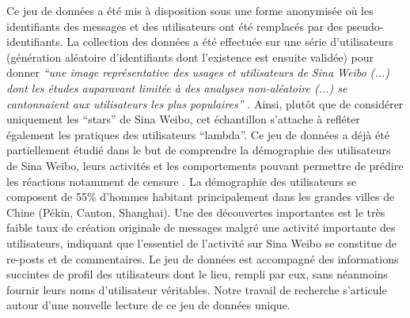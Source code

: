 Ce jeu de donn\'ees a \'et\'e mis \`a disposition sous une forme
anonymis\'ee o\`u les identifiants des messages et des utilisateurs ont
\'et\'e remplac\'es par des pseudo-identifiants. La collection des
donn\'ees a \'et\'e effectu\'ee sur une s\'erie
d{\textquoteright}utilisateurs (g\'en\'eration al\'eatoire
d{\textquoteright}identifiants dont l{\textquoteright}existence est
ensuite valid\'ee) pour donner \textit{{\textquotedblleft}une image
repr\'esentative des usages et utilisateurs de Sina Weibo (...) dont
les \'etudes auparavant limit\'ee \`a des analyses non-al\'eatoire
(...) se cantonnaient aux utilisateurs les plus
populaires{\textquotedblright} }\citep{Fu2013}. Ainsi, plut\^ot que
de consid\'erer uniquement les
{\textquotedblleft}stars{\textquotedblright} de Sina Weibo, cet
\'echantillon s{\textquoteright}attache \`a refl\'eter \'egalement les
pratiques des utilisateurs
{\textquotedblleft}lambda{\textquotedblright}. Ce jeu de donn\'ees a
d\'ej\`a \'et\'e partiellement \'etudi\'e dans le but de comprendre la
d\'emographie des utilisateurs de Sina Weibo, leurs activit\'es et les
comportements pouvant permettre de pr\'edire les r\'eactions notamment
de censure \citep{Fu2013}. La d\'emographie des utilisateurs se
composent de 55\% d{\textquoteright}hommes habitant principalement dans
les grandes villes de Chine (P\'ekin, Canton, Shanghai). Une des
d\'ecouvertes importantes est le tr\`es faible taux de cr\'eation
originale de messages malgr\'e une activit\'e importante des
utilisateurs, indiquant que l{\textquoteright}essentiel de
l{\textquoteright}activit\'e sur Sina Weibo se constitue de re-posts et
de commentaires. Le jeu de donn\'ees est accompagn\'e des informations
succintes de profil des utilisateurs dont le lieu, rempli par eux, sans
n\'eanmoins fournir leurs noms d{\textquoteright}utilisateur
v\'eritables. Notre travail de recherche s{\textquoteright}articule
autour d{\textquoteright}une nouvelle lecture de ce jeu de donn\'ees
unique.


